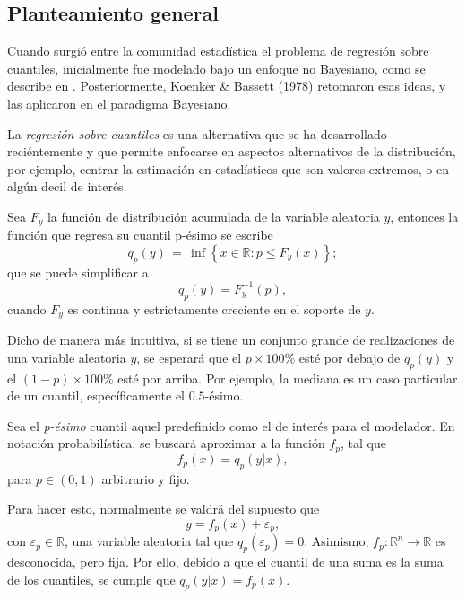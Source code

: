 \subsection{Planteamiento general}

Cuando surgi\'o entre la comunidad estad\'istica el problema de regresi\'on sobre cuantiles, inicialmente fue modelado bajo un enfoque no Bayesiano, como se describe en \cite{Yu_BayQuantReg}.  Posteriormente, Koenker \& Bassett (1978) retomaron esas ideas, y las aplicaron en el paradigma Bayesiano. 

La \textit{regresi\'on sobre cuantiles} es una alternativa que se ha desarrollado reci\'entemente y que permite enfocarse en aspectos alternativos de la distribuci\'on, por ejemplo, centrar la estimaci\'on en estad\'isticos que son valores extremos, o en alg\'un decil de inter\'es. 

\begin{defin}
Sea $F_y$ la funci\'on de distribuci\'on acumulada de la variable aleatoria $y$, entonces la funci\'on que regresa su cuantil p-\'esimo se escribe
\begin{equation*}
    q_p(y)\,=\,\inf \left\{x\in {\mathbb  {R}}:p\leq F_y(x)\right\};
\end{equation*}
que se puede simplificar a
\begin{equation*}
    q_p(y)=F_y^{-1}(p),
\end{equation*}
cuando $F_y$ es continua y estrictamente creciente en el soporte de $y$.
\end{defin}
Dicho de manera m\'as intuitiva, si se tiene un conjunto grande de realizaciones de una variable aleatoria $y$, se esperar\'a que el $p \times 100\%$ est\'e por debajo de $q_p(y)$ y el $(1-p) \times 100\%$ est\'e por arriba. Por ejemplo, la mediana es un caso particular de un cuantil, espec\'ificamente el $0.5$-\'esimo. 

Sea el \textit{p-\'esimo} cuantil aquel predefinido como el de inter\'es para el modelador. En notaci\'on probabil\'istica, se buscar\'a aproximar a la funci\'on $f_p$, tal que 
\begin{equation*}
    f_p(x) = q_p(y|x),
\end{equation*}
para $p \in (0,1)$ arbitrario y fijo.

Para hacer esto, normalmente se valdr\'a del supuesto que
\begin{equation*}
    y = f_p(x) + \varepsilon_p,
\end{equation*}
con $\varepsilon_p \in \mathbb{R}$, una variable aleatoria tal que $q_p(\varepsilon_p) = 0$. Asimismo, $f_p: \mathbb{R}^n \rightarrow \mathbb{R}$ es desconocida, pero fija. Por ello, debido a que el cuantil de una suma es la suma de los cuantiles, se cumple que $q_p(y|x) = f_p(x)$.

